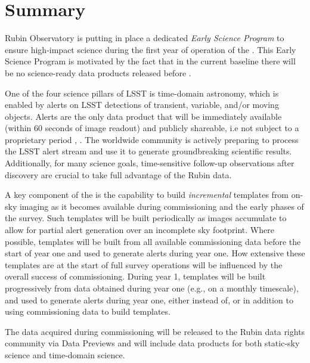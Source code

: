 \section{Summary}

Rubin Observatory is putting in place a dedicated {\it Early Science Program} to ensure high-impact science during the first year of operation of the \lsst.
This Early Science Program is motivated by the fact that in the current baseline there will be no science-ready data products released before \drone. 

One of the four science pillars of LSST is time-domain astronomy, which is enabled by alerts on LSST detections of transient, variable, and/or moving objects. 
Alerts are the only data product that will be immediately available (within 60 seconds of image readout) and publicly shareable, i.e not subject to a proprietary period \citep{LSE-163},  \citep{RDO-013}. 
The worldwide community is actively preparing to process the LSST alert stream and use it to generate groundbreaking scientific results. Additionally, for many science goals, time-sensitive follow-up observations after discovery are crucial to take full advantage of the Rubin data. 

A key component of the \esp is the capability to build {\it incremental} templates from on-sky imaging as it becomes available during commissioning and the early phases of the survey. 
Such templates will be built periodically as images accumulate to allow for partial alert generation over an incomplete sky footprint.
Where possible, templates will be built from all available commissioning data before the start of year one and used to generate alerts during year one.
How extensive these templates are at the start of full survey operations will be influenced by the overall success of commissioning.
During year 1, templates will be built progressively from data obtained during year one (e.g., on a monthly timescale), and used to generate alerts during year one, either instead of, or in addition to using commissioning data to build templates.

The data acquired during commissioning will be released to the Rubin data rights community via Data Previews and will include data products for both static-sky science and time-domain science.